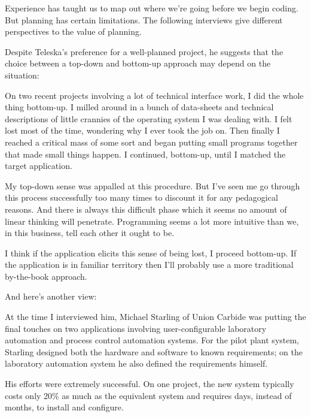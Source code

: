 Experience has taught us to map out where we're going before we begin
coding. But planning has certain limitations. The following interviews
give different perspectives to the value of planning.

\bigskip\blackline{2ex}
\noindent Despite Teleska's preference for a well-planned project, he suggests that
the choice between a top-down and bottom-up approach may depend on
the situation:

\begin{tfquot}
On two recent projects involving a lot of technical interface work, I did the
whole thing bottom-up. I milled around in a bunch of data-sheets and
technical descriptions of little crannies of the operating system I was
dealing with. I felt lost most of the time, wondering why I ever took the job on.
Then finally I reached a critical mass of some sort and began putting small
programs together that made small things happen. I continued, bottom-up,
until I matched the target application.

My top-down sense was appalled at this procedure. But I've seen me go
through this process successfully too many times to discount it for any
pedagogical reasons. And there is always this difficult phase which it seems
no amount of linear thinking will penetrate. Programming seems a lot more
intuitive than we, in this business, tell each other it ought to be.

I think if the application elicits this sense of being lost, I proceed
bottom-up. If the application is in familiar territory then I'll probably
use a more traditional by-the-book approach.
\end{tfquot}
\blackline{2ex}


\noindent And here's another view:

\bigskip\blackline{2ex}
\noindent At the time I interviewed him, Michael Starling of Union Carbide was
putting the final touches on two applications involving user-configurable
laboratory automation and process control automation systems. For the
pilot plant system, Starling designed both the hardware and software to
known requirements; on the laboratory automation system he also
defined the requirements himself.

His efforts were extremely successful. On one project, the new
system typically costs only 20\% as much as the equivalent system and
requires days, instead of months, to install and configure.

